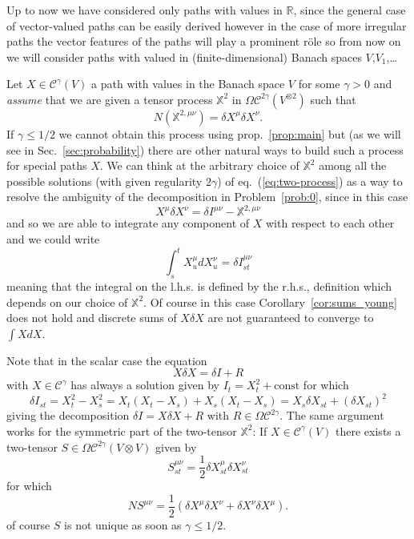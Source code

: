 \documentclass[a4paper,12pt,reqno]{amsproc}
\newcommand{\der}{\delta\!}
\newcommand{\XX}{\mathbb{X}}
\newcommand{\NN}{N}
\newcommand{\CC}{\mathcal{C}}
\newcommand{\OCC}{\Omega \mathcal{C}}
\begin{document}
Up to now we have considered only paths with values in $\mathbb{R}$,
since the general case of vector-valued paths can be easily derived
however in the case of more irregular paths the vector features of
the paths will play a prominent r\"ole so from now on we will consider
paths with valued in (finite-dimensional) Banach spaces $V$,$V_1$,\dots

Let $X \in \CC^\gamma(V)$ a path with values in the Banach space $V$
for some $\gamma > 0$ and \emph{assume} that we are given a tensor
process $\mathbb{X}^2$ in
$\OCC^{2\gamma}(V^{\otimes 2})$ such that
\begin{equation}
\label{eq:two-process}
  \NN (\XX^{2,\mu\nu}) =  \der X^\mu \der X^\nu.
\end{equation}
If $\gamma \le 1/2$ we cannot obtain this process using
prop.~\ref{prop:main} but (as we will see in Sec.~\ref{sec:probability}) there are other natural ways
to build such a process for special paths $X$. We can think at the
arbitrary choice of $\mathbb{X}^2$ among all the possible solutions
(with given regularity $2\gamma$) of eq.~(\ref{eq:two-process}) as a
way to resolve the ambiguity of the decomposition  in
Problem~\ref{prob:0}, since in this case
$$
X^\mu \der X^\nu = \der I^{\mu\nu} - \mathbb{X}^{2,\mu\nu}
$$
and so we are able to integrate any component of $X$ with respect to
each other and we could write
$$
\int_s^t X_u^\mu dX^\nu_u = \der I^{\mu\nu}_{st}
$$
meaning that the integral on the l.h.s. is defined by the r.h.s.,
definition which depends on our choice of $\mathbb{X}^2$. Of course
in this case Corollary~\ref{cor:sums_young} does not hold and discrete
sums of $X\der X$ are not guaranteed to converge to $\int X dX$.

Note that in the scalar case the equation
$$
X \der X = \der I + R
$$
with $X \in \CC^\gamma$
has always a solution given by 
$
I_{t} = X_t^2 + \text{const} 
$
for which  
$$
\der I_{st} = X_t^2 - X_s^2 = X_t(X_t-X_s) + X_s(X_t-X_s) = X_s \der
X_{st} + (\der X_{st})^2  
$$
giving the decomposition $\der I = X \der X + R$ with $R \in
\OCC^{2\gamma}$.
The same argument works for the symmetric part of the two-tensor
$\mathbb{X}^2$: If $X \in \CC^\gamma(V)$ there exists a two-tensor $S \in \OCC^{2\gamma}(V
\otimes V)$ given by
$$
S_{st}^{\mu\nu} = \frac{1}{2}\der X_{st}^\mu \der X_{st}^\nu
$$
for which
$$
\NN  S^{\mu\nu} = \frac{1}{2} (\der X^\mu \der X^\nu + \der X^\nu \der X^\mu) .
$$
of course $S$ is not unique as soon as $\gamma \le 1/2$.
\end{document}
